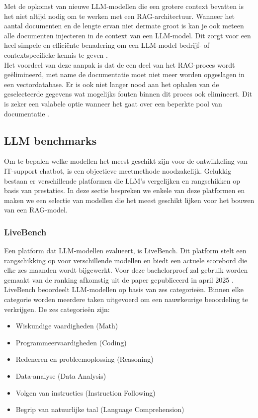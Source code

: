 Met de opkomst van nieuwe LLM-modellen die een grotere context bevatten is het niet altijd nodig om te werken met een RAG-architectuur. Wanneer het aantal documenten en de lengte ervan niet dermate groot is kan je ook meteen alle documenten injecteren in de context van een LLM-model. Dit zorgt voor een heel simpele en efficiënte benadering om een LLM-model bedrijf- of contextspecifieke kennis te geven \autocite{Chan2025}.
\\[1em]
Het voordeel van deze aanpak is dat de een deel van het RAG-proces wordt geëlimineerd, met name de documentatie moet niet meer worden opgeslagen in een vectordatabase. 
Er is ook niet langer nood aan het ophalen van de geselecteerde gegevens wat mogelijks fouten binnen dit proces ook elimineert. Dit is zeker een valabele optie wanneer het gaat over een beperkte pool van documentatie \autocite{Chan2025}. 

\subsection{LLM benchmarks}
Om te bepalen welke modellen het meest geschikt zijn voor de ontwikkeling van IT-support chatbot, is een objectieve meetmethode noodzakelijk. Gelukkig bestaan er verschillende platformen die LLM's vergelijken en rangschikken op basis van prestaties. In deze sectie bespreken we enkele van deze platformen en maken we een selectie van modellen die het meest geschikt lijken voor het bouwen van een RAG-model.
   
\subsubsection{LiveBench} 
Een platform dat LLM-modellen evalueert, is LiveBench. Dit platform stelt een rangschikking op voor verschillende modellen en biedt een actuele scorebord die elke zes maanden wordt bijgewerkt. Voor deze bachelorproef zal gebruik worden gemaakt van de ranking afkomstig uit de paper gepubliceerd in april 2025 \autocite{livebench}.
\\[1em]
LiveBench beoordeelt LLM-modellen op basis van zes categorieën. Binnen elke categorie worden meerdere taken uitgevoerd om een nauwkeurige beoordeling te verkrijgen. De zes categorieën zijn:
\begin{itemize}
    \item Wiskundige vaardigheden (Math)
    \item Programmeervaardigheden (Coding)
    \item Redeneren en probleemoplossing (Reasoning)
    \item Data-analyse (Data Analysis)
    \item Volgen van instructies (Instruction Following)
    \item Begrip van natuurlijke taal (Language Comprehension)
\end{itemize}

